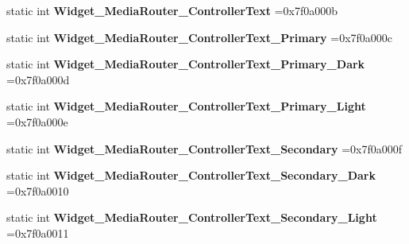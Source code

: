 \begin{DoxyCompactItemize}
\item 
\mbox{\label{classandroid_1_1support_1_1v7_1_1recyclerview_1_1R_1_1style_a273ee52ca5fdaca5896af9195b1ed58d}} 
static int {\bfseries Widget\+\_\+\+Media\+Router\+\_\+\+Controller\+Text} =0x7f0a000b
\item 
\mbox{\label{classandroid_1_1support_1_1v7_1_1recyclerview_1_1R_1_1style_ace16d5da5db02d0ff9b53bf6d54e6aa2}} 
static int {\bfseries Widget\+\_\+\+Media\+Router\+\_\+\+Controller\+Text\+\_\+\+Primary} =0x7f0a000c
\item 
\mbox{\label{classandroid_1_1support_1_1v7_1_1recyclerview_1_1R_1_1style_af8cebd924f6646ecb82fac35692811a4}} 
static int {\bfseries Widget\+\_\+\+Media\+Router\+\_\+\+Controller\+Text\+\_\+\+Primary\+\_\+\+Dark} =0x7f0a000d
\item 
\mbox{\label{classandroid_1_1support_1_1v7_1_1recyclerview_1_1R_1_1style_a2e7841fdbc3cf18889e04503737d44fe}} 
static int {\bfseries Widget\+\_\+\+Media\+Router\+\_\+\+Controller\+Text\+\_\+\+Primary\+\_\+\+Light} =0x7f0a000e
\item 
\mbox{\label{classandroid_1_1support_1_1v7_1_1recyclerview_1_1R_1_1style_a4eddceefbe6dd0462b52447925ba26a2}} 
static int {\bfseries Widget\+\_\+\+Media\+Router\+\_\+\+Controller\+Text\+\_\+\+Secondary} =0x7f0a000f
\item 
\mbox{\label{classandroid_1_1support_1_1v7_1_1recyclerview_1_1R_1_1style_adf69b42084983ce873e674c47f3df013}} 
static int {\bfseries Widget\+\_\+\+Media\+Router\+\_\+\+Controller\+Text\+\_\+\+Secondary\+\_\+\+Dark} =0x7f0a0010
\item 
\mbox{\label{classandroid_1_1support_1_1v7_1_1recyclerview_1_1R_1_1style_a4d98aa8d91a2b84dba6482cd57b4e60a}} 
static int {\bfseries Widget\+\_\+\+Media\+Router\+\_\+\+Controller\+Text\+\_\+\+Secondary\+\_\+\+Light} =0x7f0a0011

\end{DoxyCompactItemize}
